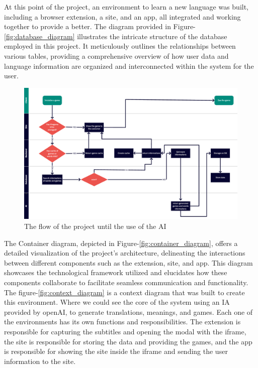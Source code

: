 \documentclass[12pt]{article}
\begin{document}
At this point of the project, an environment to learn a new language was built, including a browser extension, a site, and an app, all integrated and working together to provide a better. The diagram provided in Figure-\ref{fig:database_diagram} illustrates the intricate structure of the database employed in this project. It meticulously outlines the relationships between various tables, providing a comprehensive overview of how user data and language information are organized and interconnected within the system for the user. \\
\begin{figure}[!h]
  \centering
  \caption{
    The flow of the project until the use of the AI
  }
  \label{fig:flow_diagram}
  \includegraphics[width=1\textwidth]{assets/26.png}
\end{figure}
The Container diagram, depicted in Figure-\ref{fig:container_diagram}, offers a detailed visualization of the project's architecture, delineating the interactions between different components such as the extension, site, and app. This diagram showcases the technological framework utilized and elucidates how these components collaborate to facilitate seamless communication and functionality. \\
The figure-\ref{fig:context_diagram} is a context diagram that was built to create this environment. Where we could see the core of the system using an IA provided by openAI, to generate translations, meanings, and games. Each one of the environments has its own functions and responsibilities. The extension is responsible for capturing the subtitles and opening the modal with the iframe, the site is responsible for storing the data and providing the games, and the app is responsible for showing the site inside the iframe and sending the user information to the site.
\end{document}
